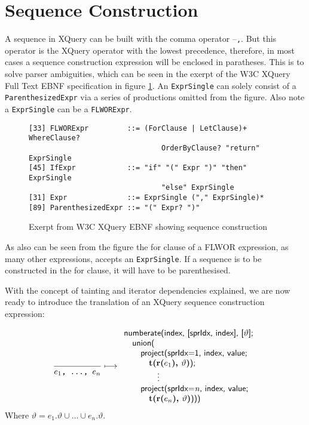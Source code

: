 \section{Sequence Construction}
\label{sect:trans:TD:seqBuild}

A sequence in XQuery can be built with the comma operator --\texttt{,}. But this operator is the XQuery operator
with the lowest precedence, therefore, in most cases a sequence construction expression will be enclosed in
paratheses. This is to solve parser ambiguities, which can be seen in the exerpt of the W3C XQuery Full Text EBNF
specification\cite{w3c01} in figure \ref{fig:trans:TD:seqEBNF}. An \texttt{ExprSingle} can solely consist of a
\texttt{ParenthesizedExpr} via a series of productions omitted from the figure. Also note a \texttt{ExprSingle}
can be a \texttt{FLWORExpr}.

\begin{figure}[h]
\begin{Verbatim}
[33] FLWORExpr         ::= (ForClause | LetClause)+ WhereClause? 
                               OrderByClause? "return" ExprSingle
[45] IfExpr            ::= "if" "(" Expr ")" "then" ExprSingle 
                               "else" ExprSingle
[31] Expr              ::= ExprSingle ("," ExprSingle)*
[89] ParenthesizedExpr ::= "(" Expr? ")"
\end{Verbatim}
\caption[Exerpt from W3C XQuery EBNF]{Exerpt from W3C XQuery EBNF showing sequence construction}
\label{fig:trans:TD:seqEBNF}
\end{figure}

As also can be seen from the figure the for clause of a FLWOR expression, as many other expressions, accepts an
\texttt{ExprSingle}. If a sequence is to be constructed in the for clause, it will have to be parenthesised. 

With the concept of tainting and iterator dependencies explained, we are now ready to introduce the translation of
an XQuery sequence construction expression:

\begin{equation}
\frac{}{e_{1}\mbox{\texttt{, \ldots, }}e_{n}}\longmapsto
\begin{array}{l}
\mbox{\textsf{numberate(index, [sprIdx, index], [}}\vartheta\mbox{\textsf{];}} \\ \quad
\mbox{\textsf{union(}} \\ \quad \quad
\mbox{\textsf{project(sprIdx=1, index, value; }} \\ \quad \quad \quad
\mbox{\textbf{t(r(}}e_{1}\mbox{\textbf{), }}\vartheta\mbox{\textbf{)}\textsf{);}} \\ \quad \quad
\qquad\vdots\\ \quad \quad
\mbox{\textsf{project(sprIdx=}\textit{n}\textsf{, index, value; }} \\ \quad \quad \quad
\mbox{\textbf{t(r(}}e_{n}\mbox{\textbf{), }}\vartheta\mbox{\textbf{)}\textsf{)))}}
\end{array}
\label{rule:trans:TD:seqConstr}
\end{equation}
Where $\vartheta=e_{1}.\vartheta \cup \ldots \cup e_{n}.\vartheta$.

